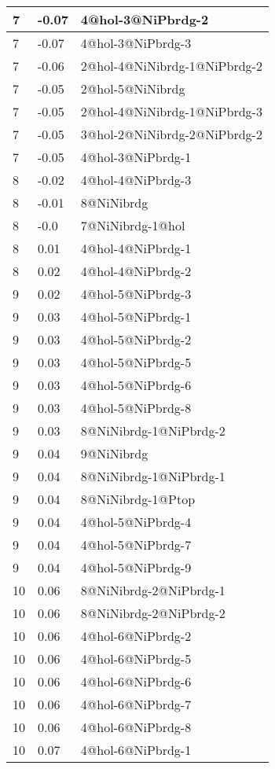 \begin{center}
\begin{longtable}{|l|l|l|}
7 & -0.07 & 4@hol-3@NiPbrdg-2 \\ \hline
7 & -0.07 & 4@hol-3@NiPbrdg-3 \\ \hline
7 & -0.06 & 2@hol-4@NiNibrdg-1@NiPbrdg-2 \\ \hline
7 & -0.05 & 2@hol-5@NiNibrdg \\ \hline
7 & -0.05 & 2@hol-4@NiNibrdg-1@NiPbrdg-3 \\ \hline
7 & -0.05 & 3@hol-2@NiNibrdg-2@NiPbrdg-2 \\ \hline
7 & -0.05 & 4@hol-3@NiPbrdg-1 \\ \hline
8 & -0.02 & 4@hol-4@NiPbrdg-3 \\ \hline
8 & -0.01 & 8@NiNibrdg \\ \hline
8 & -0.0 & 7@NiNibrdg-1@hol \\ \hline
8 & 0.01 & 4@hol-4@NiPbrdg-1 \\ \hline
8 & 0.02 & 4@hol-4@NiPbrdg-2 \\ \hline
9 & 0.02 & 4@hol-5@NiPbrdg-3 \\ \hline
9 & 0.03 & 4@hol-5@NiPbrdg-1 \\ \hline
9 & 0.03 & 4@hol-5@NiPbrdg-2 \\ \hline
9 & 0.03 & 4@hol-5@NiPbrdg-5 \\ \hline
9 & 0.03 & 4@hol-5@NiPbrdg-6 \\ \hline
9 & 0.03 & 4@hol-5@NiPbrdg-8 \\ \hline
9 & 0.03 & 8@NiNibrdg-1@NiPbrdg-2 \\ \hline
9 & 0.04 & 9@NiNibrdg \\ \hline
9 & 0.04 & 8@NiNibrdg-1@NiPbrdg-1 \\ \hline
9 & 0.04 & 8@NiNibrdg-1@Ptop \\ \hline
9 & 0.04 & 4@hol-5@NiPbrdg-4 \\ \hline
9 & 0.04 & 4@hol-5@NiPbrdg-7 \\ \hline
9 & 0.04 & 4@hol-5@NiPbrdg-9 \\ \hline
10 & 0.06 & 8@NiNibrdg-2@NiPbrdg-1 \\ \hline
10 & 0.06 & 8@NiNibrdg-2@NiPbrdg-2 \\ \hline
10 & 0.06 & 4@hol-6@NiPbrdg-2 \\ \hline
10 & 0.06 & 4@hol-6@NiPbrdg-5 \\ \hline
10 & 0.06 & 4@hol-6@NiPbrdg-6 \\ \hline
10 & 0.06 & 4@hol-6@NiPbrdg-7 \\ \hline
10 & 0.06 & 4@hol-6@NiPbrdg-8 \\ \hline
10 & 0.07 & 4@hol-6@NiPbrdg-1 \\ \hline

\end{longtable}
\end{center}
